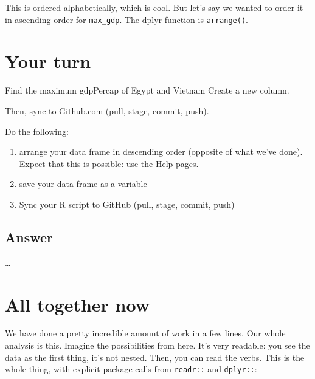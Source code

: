 \documentclass[]{book}
\newenvironment{Shaded}{\begin{snugshade}}{\end{snugshade}}
\newcommand{\KeywordTok}[1]{\textcolor[rgb]{0.13,0.29,0.53}{\textbf{{#1}}}}
\newcommand{\DataTypeTok}[1]{\textcolor[rgb]{0.13,0.29,0.53}{{#1}}}
\newcommand{\StringTok}[1]{\textcolor[rgb]{0.31,0.60,0.02}{{#1}}}
\newcommand{\NormalTok}[1]{{#1}}
\providecommand{\tightlist}{%
  \setlength{\itemsep}{0pt}\setlength{\parskip}{0pt}}
\theoremstyle{definition}
\theoremstyle{definition}
\theoremstyle{definition}
\theoremstyle{remark}
\begin{document}
This is ordered alphabetically, which is cool. But let's say we wanted
to order it in ascending order for \texttt{max\_gdp}. The dplyr function
is \texttt{arrange()}.

\begin{Shaded}
\end{Shaded}

\section{Your turn}\label{your-turn-8}

Find the maximum gdpPercap of Egypt and Vietnam Create a new column.

Then, sync to Github.com (pull, stage, commit, push).

Do the following:

\begin{enumerate}
\def\labelenumi{\arabic{enumi}.}
\tightlist
\item
  arrange your data frame in descending order (opposite of what we've
  done). Expect that this is possible: use the Help pages.
\item
  save your data frame as a variable
\item
  Sync your R script to GitHub (pull, stage, commit, push)
\end{enumerate}

\subsection{Answer}\label{answer-2}

\ldots{}

\section{All together now}\label{all-together-now}

We have done a pretty incredible amount of work in a few lines. Our
whole analysis is this. Imagine the possibilities from here. It's very
readable: you see the data as the first thing, it's not nested. Then,
you can read the verbs. This is the whole thing, with explicit package
calls from \texttt{readr::} and \texttt{dplyr::}:
\end{document}
